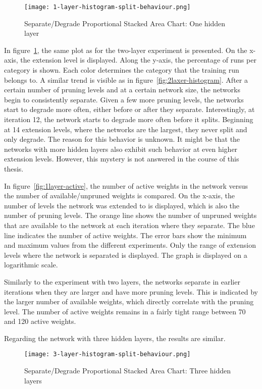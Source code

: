 \begin{figure}[ht]
    \centering
    \texttt{[image: 1-layer-histogram-split-behaviour.png]}
    \caption{Separate/Degrade Proportional Stacked Area Chart: One hidden layer
    }\label{fig:1layer-histogram}
\end{figure}

In figure~\ref{fig:1layer-histogram}, the same plot as for the two-layer experiment is presented.
On the x-axis, the extension level is displayed. 
Along the y-axis, the percentage of runs per category is shown.
Each color determines the category that the training run belongs to.
A similar trend is visible as in figure~\ref{fig:2laxer-histogram}.
After a certain number of pruning levels and at a certain network size, the networks begin to consistently separate.
Given a few more pruning levels, the networks start to degrade more often, either before or after they separate.
Interestingly, at iteration 12, the network starts to degrade more often before it splits.
Beginning at 14 extension levels, where the networks are the largest, they never split and only degrade.
The reason for this behavior is unknown.
It might be that the networks with more hidden layers also exhibit such behavior at even higher extension levels. 
However, this mystery is not answered in the course of this thesis.

In figure~\ref{fig:1layer-active}, the number of active weights in the network versus the number of available/unpruned weights is compared.
On the x-axis, the number of levels the network was extended to is displayed, which is also the number of pruning levels.
The orange line shows the number of unpruned weights that are available to the network at each iteration where they separate.
The blue line indicates the number of active weights.
The error bars show the minimum and maximum values from the different experiments.
Only the range of extension levels where the network is separated is displayed.
The graph is displayed on a logarithmic scale.

Similarly to the experiment with two layers, the networks separate in earlier iterations when they are larger and have more pruning levels.
This is indicated by the larger number of available weights, which directly correlate with the pruning level.
The number of active weights remains in a fairly tight range between 70 and 120 active weights.

Regarding the network with three hidden layers, the results are similar.
\begin{figure}[ht]
    \centering
    \texttt{[image: 3-layer-histogram-split-behaviour.png]}
    \caption{
        Separate/Degrade Proportional Stacked Area Chart: Three hidden layers
    }\label{fig:3layer-histogram}
\end{figure}

